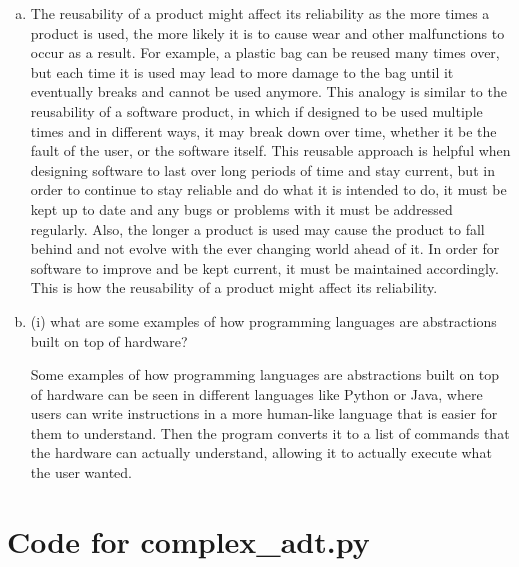 \documentclass[12pt]{article}
\begin{document}
\begin{enumerate}[(a)]
\item The reusability of a product might affect its reliability as the more times 
a product is used, the more likely it is to cause wear and other malfunctions 
to occur as a result. For example, a plastic bag can be reused many times over, 
but each time it is used may lead to more damage to the bag until it eventually 
breaks and cannot be used anymore. This analogy is similar to the reusability 
of a software product, in which if designed to be used multiple times and in 
different ways, it may break down over time, whether it be the fault of the 
user, or the software itself. This reusable approach is helpful when designing 
software to last over long periods of time and stay current, but in order to 
continue to stay reliable and do what it is intended to do, it must be kept 
up to date and any bugs or problems with it must be addressed regularly. Also, 
the longer a product is used may cause the product to fall behind and not evolve 
with the ever changing world ahead of it. In order for software to improve and be 
kept current, it must be maintained accordingly. This is how the reusability of a 
product might affect its reliability. 

\item (i) what are some examples of how programming languages are abstractions built on top of hardware?

Some examples of how programming languages are abstractions built on top of hardware  can be seen in different languages like Python or Java, where users can write instructions in a more human-like language that is easier for them to understand. Then the program converts it to a list of commands that the hardware can actually understand, allowing it to actually execute what the user wanted.



\end{enumerate}

\newpage

\lstset{language=Python, basicstyle=\tiny, breaklines=true, showspaces=false,
  showstringspaces=false, breakatwhitespace=true}

\def\thesection{\Alph{section}}

\section{Code for complex\_adt.py}

\noindent 
\end{document}
